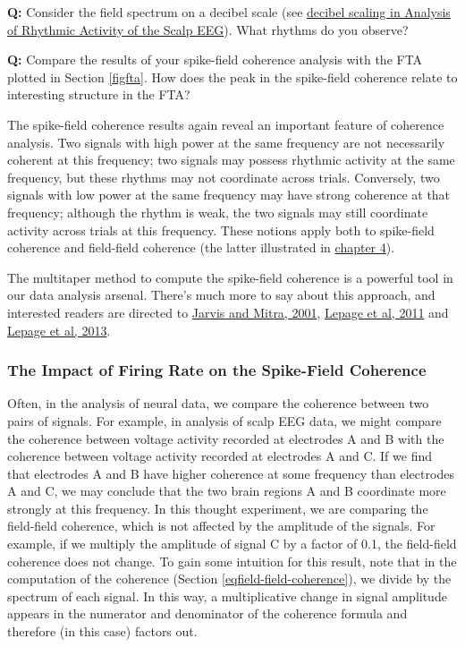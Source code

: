 \documentclass[11pt]{article}
\begin{document}
    \textbf{Q:} Consider the field spectrum on a decibel scale (see
\href{../Analysis\%20of\%20Rhythmic\%20Activity\%20in\%20the\%20Scalp\%20EEG/Analysis\%20of\%20rhythmic\%20activity\%20in\%20the\%20Scalp\%20EEG.ipynb\#decibel-scaling}{decibel
scaling in Analysis of Rhythmic Activity of the Scalp EEG}). What
rhythms do you observe?

    \textbf{Q:} Compare the results of your spike-field coherence analysis
with the FTA plotted in Section \ref{figfta}. How does the peak in the
spike-field coherence relate to interesting structure in the FTA?

    The spike-field coherence results again reveal an important feature of
coherence analysis. Two signals with high power at the same frequency
are not necessarily coherent at this frequency; two signals may possess
rhythmic activity at the same frequency, but these rhythms may not
coordinate across trials. Conversely, two signals with low power at the
same frequency may have strong coherence at that frequency; although the
rhythm is weak, the two signals may still coordinate activity across
trials at this frequency. These notions apply both to spike-field
coherence and field-field coherence (the latter illustrated in
\href{to\%20add}{chapter 4}).

The multitaper method to compute the spike-field coherence is a powerful
tool in our data analysis arsenal. There's much more to say about this
approach, and interested readers are directed to
\href{https://www.ncbi.nlm.nih.gov/pubmed/11255566}{Jarvis and Mitra,
2001}, \href{https://www.ncbi.nlm.nih.gov/pubmed/21671792}{Lepage et al,
2011} and
\href{https://www.ncbi.nlm.nih.gov/pmc/articles/PMC3800189/}{Lepage et
al, 2013}.

    \subsubsection{The Impact of Firing Rate on the Spike-Field
Coherence}\label{the-impact-of-firing-rate-on-the-spike-field-coherence}

Often, in the analysis of neural data, we compare the coherence between
two pairs of signals. For example, in analysis of scalp EEG data, we
might compare the coherence between voltage activity recorded at
electrodes A and B with the coherence between voltage activity recorded
at electrodes A and C. If we find that electrodes A and B have higher
coherence at some frequency than electrodes A and C, we may conclude
that the two brain regions A and B coordinate more strongly at this
frequency. In this thought experiment, we are comparing the field-field
coherence, which is not affected by the amplitude of the signals. For
example, if we multiply the amplitude of signal C by a factor of 0.1,
the field-field coherence does not change. To gain some intuition for
this result, note that in the computation of the coherence
(Section \ref{eqfield-field-coherence}), we divide by the spectrum of
each signal. In this way, a multiplicative change in signal amplitude
appears in the numerator and denominator of the coherence formula and
therefore (in this case) factors out.
\end{document}
